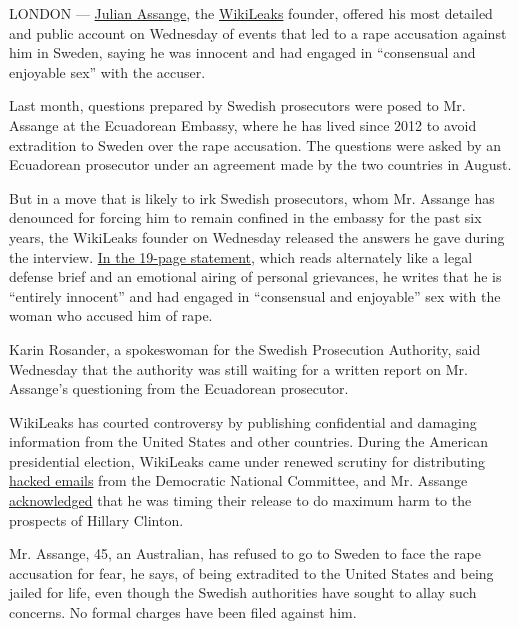 LONDON ---
\href{http://topics.nytimes3xbfgragh.onion/top/reference/timestopics/people/a/julian_p_assange/index.html?inline=nyt-per}{Julian
Assange}, the
\href{http://topics.nytimes3xbfgragh.onion/top/reference/timestopics/organizations/w/wikileaks/index.html?inline=nyt-org}{WikiLeaks}
founder, offered his most detailed and public account on Wednesday of
events that led to a rape accusation against him in Sweden, saying he
was innocent and had engaged in ``consensual and enjoyable sex'' with
the accuser.

Last month, questions prepared by Swedish prosecutors were posed to Mr.
Assange at the Ecuadorean Embassy, where he has lived since 2012 to
avoid extradition to Sweden over the rape accusation. The questions were
asked by an Ecuadorean prosecutor under an agreement made by the two
countries in August.

But in a move that is likely to irk Swedish prosecutors, whom Mr.
Assange has denounced for forcing him to remain confined in the embassy
for the past six years, the WikiLeaks founder on Wednesday released the
answers he gave during the interview.
\href{https://justice4assange.com/IMG/html/assange-statement-2016.html}{In
the 19-page statement}, which reads alternately like a legal defense
brief and an emotional airing of personal grievances, he writes that he
is ``entirely innocent'' and had engaged in ``consensual and enjoyable''
sex with the woman who accused him of rape.

Karin Rosander, a spokeswoman for the Swedish Prosecution Authority,
said Wednesday that the authority was still waiting for a written report
on Mr. Assange's questioning from the Ecuadorean prosecutor.

WikiLeaks has courted controversy by publishing confidential and
damaging information from the United States and other countries. During
the American presidential election, WikiLeaks came under renewed
scrutiny for distributing
\href{http://www.nytimes3xbfgragh.onion/2016/10/08/us/politics/us-formally-accuses-russia-of-stealing-dnc-emails.html}{hacked
emails} from the Democratic National Committee, and Mr. Assange
\href{http://www.nytimes3xbfgragh.onion/2016/07/27/us/politics/assange-timed-wikileaks-release-of-democratic-emails-to-harm-hillary-clinton.html}{acknowledged}
that he was timing their release to do maximum harm to the prospects of
Hillary Clinton.

Mr. Assange, 45, an Australian, has refused to go to Sweden to face the
rape accusation for fear, he says, of being extradited to the United
States and being jailed for life, even though the Swedish authorities
have sought to allay such concerns. No formal charges have been filed
against him.

